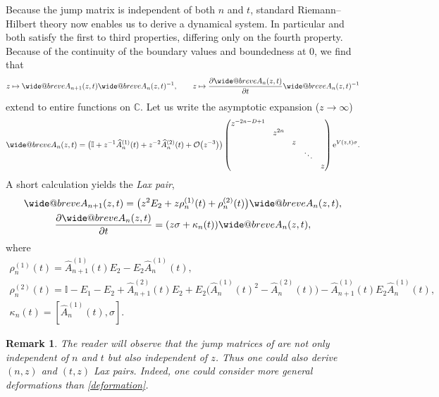 \documentclass[pdftex]{sigma}
\makeatletter
\numberwithin{equation}{section}
\newtheorem{Remark}[Theorem]{Remark}
\def\widebreve{\mathpalette\wide@breve}
\def\wide@breve#1#2{\sbox\z@{$#1#2$}%
 \mathop{\vbox{\m@th\ialign{##\crcr
\kern0.08em\brevefill#1{0.8\wd\z@}\crcr\noalign{\nointerlineskip}%
 $\hss#1#2\hss$\crcr}}}\limits}
\def\brevefill#1#2{$\m@th\sbox\tw@{$#1($}%
 \hss\resizebox{#2}{\wd\tw@}{\rotatebox[origin=c]{90}{\upshape(}}\hss$}
\makeatother
\begin{document}
Because the jump matrix is independent of both $n$ and $t$, standard Riemann--Hilbert theory now enables us to derive a dynamical system. In particular \smash{$\widebreve{A}_{n+1}(z,t)$} and \smash{$\frac{\partial \widebreve{A}_{n}(z,t)}{\partial t}$} both satisfy the first to third properties, differing only on the fourth property. Because of the continuity of the boundary values and boundedness at $0$, we find that
\begin{align*}
z \mapsto \widebreve{A}_{n+1}(z,t)\widebreve{A}_{n}(z,t)^{-1},\qquad
z \mapsto \frac{\partial \widebreve{A}_{n}(z,t)}{\partial t}
\widebreve{A}_{n}(z,t)^{-1}
\end{align*}
extend to entire functions on $\mathbb{C}$. Let us write the asymptotic expansion ($z \to \infty$)
\begin{align*}
\widebreve{A}_{n}(z,t) = \big(\mathbb{I}+ z^{-1} \widehat{A}_{n}^{(1)}(t) + z^{-2} \widehat{A}_{n}^{(2)}(t) + \mathcal{O}\big(z^{-3}\big) \big) \left(\begin{matrix}
z^{-2n-D+1} \\
& z^{2n} \\
& & z \\
& & & \ddots \\
& & & & z
\end{matrix} \right) {\rm e}^{ V(z,t) \sigma}.
\end{align*}
A short calculation yields the \textit{Lax pair},
\begin{gather}
\widebreve{A}_{n+1}(z,t) = \big( z^2 E_2 + z \rho_n^{(1)}(t) + \rho_n^{(2)}(t) \big) \widebreve{A}_{n}(z,t), \label{Laxpair1} \\
\frac{\partial \widebreve{A}_{n}(z,t)}{\partial t} = ( z \sigma + \kappa_n(t) ) \widebreve{A}_{n}(z,t), \label{Laxpair2}
\end{gather}
where
\begin{gather*}
\rho_n^{(1)}(t) = \widehat{A}_{n+1}^{(1)}(t) E_2 - E_2 \widehat{A}_{n}^{(1)}(t), \\
\rho_n^{(2)}(t) = \mathbb{I} - E_1 - E_2 + \widehat{A}_{n+1}^{(2)}(t) E_2 + E_2 \big( \widehat{A}_{n}^{(1)}(t)^2 - \widehat{A}_{n}^{(2)}(t) \big) - \widehat{A}_{n+1}^{(1)}(t) E_2 \widehat{A}_{n}^{(1)}(t), \\
\kappa_n(t) = [\widehat{A}_{n}^{(1)}(t),\sigma].
\end{gather*}
\begin{Remark} The reader will observe that the jump matrices of \smash{$\widebreve{A}_n$} are not only independent of $n$ and $t$ but also independent of $z$. Thus one could also derive $(n,z)$ and $(t,z)$ Lax pairs. Indeed, one could consider more general deformations than \eqref{deformation}.
\end{Remark}
\end{document}

